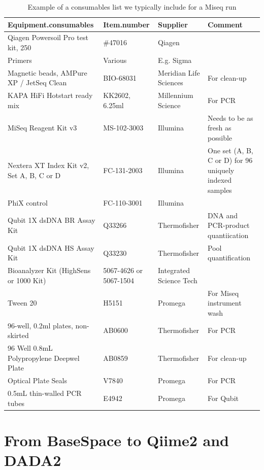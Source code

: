 \documentclass[
]{book}
\begin{document}
\begin{table}

\caption{\label{tab:consumables}Example of a consumables list we typically include for a Miseq run}
\centering
\begin{tabular}[t]{llll}
\toprule
Equipment.consumables & Item.number & Supplier & Comment\\
\midrule
Qiagen Powersoil Pro test kit, 250 & \#47016 & Qiagen & \\
Primers & Various & E.g. Sigma & \\
Magnetic beads,  AMPure XP / JetSeq Clean & BIO-68031 & Meridian Life Sciences & For clean-up\\
KAPA HiFi Hotstart ready mix & KK2602, 6.25ml & Millennium Science & For PCR\\
MiSeq Reagent Kit v3 & MS-102-3003 & Illumina & Needs to be as fresh as possible\\
\addlinespace
Nextera XT Index Kit v2, Set A, B, C or D & FC-131-2003 & Illumina & One set (A, B, C or D) for 96 uniquely  indexed samples\\
PhiX control & FC-110-3001 & Illumina & \\
Qubit 1X dsDNA BR Assay Kit & Q33266 & Thermofisher & DNA and PCR-product quantiication\\
Qubit 1X dsDNA HS Assay Kit & Q33230 & Thermofisher & Pool quantification\\
Bioanalyzer Kit (HighSens or 1000 Kit) & 5067-4626 or 5067-1504 & Integrated Science Tech & \\
\addlinespace
Tween 20 & H5151 & Promega & For Miseq instrument wash\\
96-well, 0.2ml plates, non-skirted & AB0600 & Thermofisher & For PCR\\
96 Well 0.8mL Polypropylene Deepwel Plate & AB0859 & Thermofisher & For clean-up\\
Optical Plate Seals & V7840 & Promega & For PCR\\
0.5mL thin-walled PCR tubes & E4942 & Promega & For Qubit\\
\bottomrule
\end{tabular}
\end{table}

\hypertarget{from-basespace-to-qiime2-and-dada2}{%
\chapter{From BaseSpace to Qiime2 and DADA2}\label{from-basespace-to-qiime2-and-dada2}}
\end{document}
